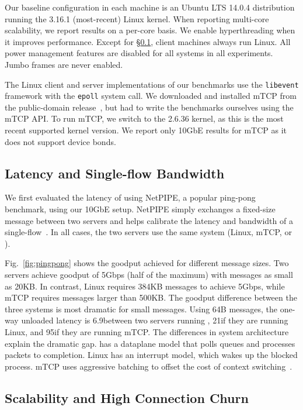Our baseline configuration in each
machine is an Ubuntu LTS 14.0.4 distribution running the 3.16.1 (most-recent) Linux kernel.
When reporting multi-core scalability, we report
results on a per-core basis. We enable hyperthreading when it improves performance. Except for
\S\ref{sec:eval:netpipe}, client machines always run Linux. All power
management features are disabled for all systems in all
experiments. Jumbo frames are never enabled.


The Linux client and server implementations of our benchmarks use the
\texttt{libevent} framework with the \texttt{epoll} system call.  We
downloaded and installed mTCP from the public-domain
release~\cite{url:mtcp}, but had to write the benchmarks ourselves
using the mTCP API.  To run mTCP, we switch to the 2.6.36 kernel, as
this is the most recent supported kernel version.  We report only
10GbE results for mTCP as it does not support device bonds.


\subsection{Latency and Single-flow Bandwidth}
\label{sec:eval:netpipe}

We first evaluated the latency of \ix using NetPIPE, a popular
ping-pong benchmark, using our 10GbE setup.  NetPIPE simply exchanges
a fixed-size message between two servers and helps calibrate the
latency and bandwidth of a single-flow~\cite{snell1996netpipe}.  In
all cases, the two servers use the same system (Linux, mTCP, or \ix).


Fig.~\ref{fig:pingpong} shows the goodput achieved for different
message sizes.  Two \ix servers achieve goodput of 5Gbps (half of the
maximum) with messages as small as 20KB. In contrast, Linux requires
384KB messages to achieve 5Gbps, while mTCP requires messages larger
than 500KB. The goodput difference between the three systems is most
dramatic for small messages. Using 64B messages, the one-way unloaded
latency is 6.9\microsecond between two servers running \ix,
21\microsecond if they are running Linux, and 95\microsecond if they
are running mTCP.  The differences in system architecture explain the
dramatic gap. \ix has a dataplane model that polls queues and
processes packets to completion. Linux has an interrupt model, which
wakes up the blocked process. mTCP uses aggressive batching to offset
the cost of context switching~\cite{jeong2014mtcp}.



\subsection{Scalability and High Connection Churn}
\label{sec:eval:short}



